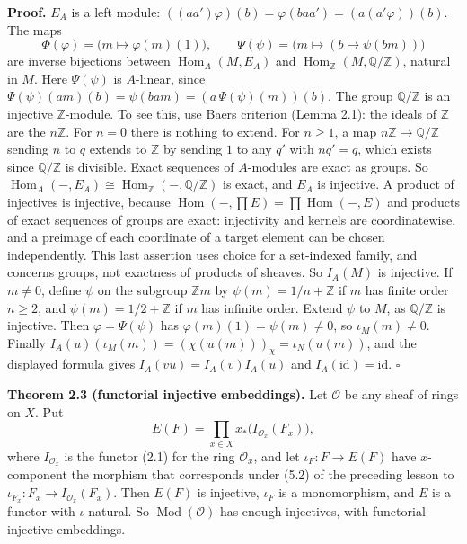 \documentclass[
  english,
  11pt,
  a4paper,
]{article}
\begin{document}
\textbf{Proof.} \(E_A\) is a left module:
\(((aa')\varphi)(b)=\varphi(baa')=(a(a'\varphi))(b)\). The maps
\[\Phi(\varphi)=\bigl(m\mapsto\varphi(m)(1)\bigr),\qquad \Psi(\psi)=\bigl(m\mapsto(b\mapsto\psi(bm))\bigr)\]
are inverse bijections between \(\operatorname{Hom}_A(M,E_A)\) and
\(\operatorname{Hom}_{\mathbb Z}(M,\mathbb Q/\mathbb Z)\), natural in
\(M\). Here \(\Psi(\psi)\) is \(A\)-linear, since
\(\Psi(\psi)(am)(b)=\psi(bam)=(a\,\Psi(\psi)(m))(b)\). The group
\(\mathbb Q/\mathbb Z\) is an injective \(\mathbb Z\)-module. To see
this, use Baer\textquotesingle s criterion (Lemma 2.1): the ideals of
\(\mathbb Z\) are the \(n\mathbb Z\). For \(n=0\) there is nothing to
extend. For \(n\geq1\), a map \(n\mathbb Z\to\mathbb Q/\mathbb Z\)
sending \(n\) to \(q\) extends to \(\mathbb Z\) by sending \(1\) to any
\(q'\) with \(nq'=q\), which exists since \(\mathbb Q/\mathbb Z\) is
divisible. Exact sequences of \(A\)-modules are exact as groups. So
\(\operatorname{Hom}_A(-,E_A)\cong\operatorname{Hom}_{\mathbb Z}(-,\mathbb Q/\mathbb Z)\)
is exact, and \(E_A\) is injective. A product of injectives is
injective, because
\(\operatorname{Hom}(-,\prod E)=\prod\operatorname{Hom}(-,E)\) and
products of exact sequences of groups are exact: injectivity and kernels
are coordinatewise, and a preimage of each coordinate of a target
element can be chosen independently. This last assertion uses choice for
a set-indexed family, and concerns groups, not exactness of products of
sheaves. So \(I_A(M)\) is injective. If \(m\neq0\), define \(\psi\) on
the subgroup \(\mathbb Zm\) by \(\psi(m)=1/n+\mathbb Z\) if \(m\) has
finite order \(n\geq2\), and \(\psi(m)=1/2+\mathbb Z\) if \(m\) has
infinite order. Extend \(\psi\) to \(M\), as \(\mathbb Q/\mathbb Z\) is
injective. Then \(\varphi=\Psi(\psi)\) has
\(\varphi(m)(1)=\psi(m)\neq0\), so \(\iota_M(m)\neq0\). Finally
\(I_A(u)(\iota_M(m))=(\chi(u(m)))_\chi=\iota_N(u(m))\), and the
displayed formula gives \(I_A(vu)=I_A(v)I_A(u)\) and
\(I_A(\mathrm{id})=\mathrm{id}\). \(\square\)

\textbf{Theorem 2.3 (functorial injective embeddings).} Let
\(\mathcal O\) be any sheaf of rings on \(X\). Put
\[E(F)=\prod_{x\in X}x_*\bigl(I_{\mathcal O_x}(F_x)\bigr),\] where
\(I_{\mathcal O_x}\) is the functor (2.1) for the ring \(\mathcal O_x\),
and let \(\iota_F:F\to E(F)\) have \(x\)-component the morphism that
corresponds under (5.2) of the preceding lesson to
\(\iota_{F_x}:F_x\to I_{\mathcal O_x}(F_x)\). Then \(E(F)\) is
injective, \(\iota_F\) is a monomorphism, and \(E\) is a functor with
\(\iota\) natural. So \(\operatorname{Mod}(\mathcal O)\) has enough
injectives, with functorial injective embeddings.
\end{document}
